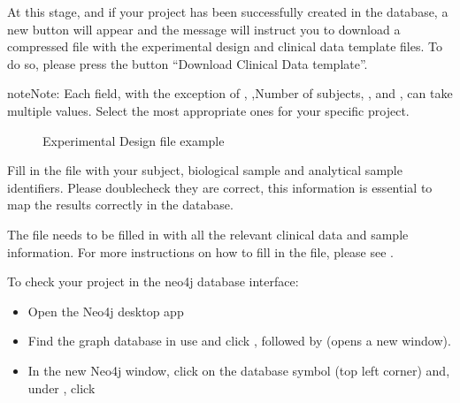 \documentclass[letterpaper,10pt,english]{sphinxmanual}
\let\sphinxpxdimen\pdfpxdimen\else\newdimen\sphinxpxdimen
\begin{document}
At this stage, and if your project has been successfully created in the database, a new button will appear and the message will instruct you to download a compressed file with the experimental design and clinical data template files. To do so, please press the button “Download Clinical Data template”. 

\begin{sphinxadmonition}{note}{Note:}
Each field, with the exception of , ,\textasciigrave{}\textasciigrave{}Number of subjects\textasciigrave{}\textasciigrave{},  ,  and , can take multiple values. Select the most appropriate ones for your specific project.
\end{sphinxadmonition}
\begin{wrapfigure}{r}{240\sphinxpxdimen}
\centering
\noindent\sphinxincludegraphics[width=240\sphinxpxdimen]{{design_file}.png}
\caption{Experimental Design file example}\label{\detokenize{getting_started/create-new-project:id3}}\end{wrapfigure}

Fill in the  file with your subject, biological sample and analytical sample identifiers. Please double\sphinxhyphen{}check they are correct, this information is essential to map the results correctly in the database.

The  file needs to be filled in with all the relevant clinical data and sample information. For more instructions on how to fill in the file, please see {\hyperref[\detokenize{getting_started/upload-data:upload-data}]{}}.

To check your project in the neo4j database interface:
\begin{itemize}
\item {} 
Open the Neo4j desktop app

\item {} 
Find the graph database in use and click , followed by  (opens a new window).

\item {} 
In the new Neo4j window, click on the database symbol (top left corner) and, under , click 

\end{itemize}
\end{document}
